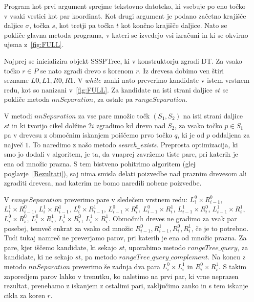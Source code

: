 \documentclass[a4paper, 12pt]{book}
\newcommand{\U}{\texttt{\_}}
\begin{document}
Program kot prvi argument sprejme tekstovno datoteko, ki vsebuje po eno točko v vsaki vrstici kot par koordinat. Kot drugi argument je podano začetno krajišče daljice $\sigma$, točka $s$, kot tretji pa točka $t$ kot končno krajišče daljice. Nato se pokliče glavna metoda programa, v kateri se izvedejo vsi izračuni in ki se okvirno ujema z~\ref{fig:FULL}.

Najprej se inicializira objekt SSSPTree, ki v konstruktorju zgradi DT. Za vsako točko $r\in P$ se nato zgradi drevo s korenom $r$. Iz drevesa dobimo ven štiri sezname $L0, L1, R0, R1$. V $while$ zanki nato preverimo kandidate v istem vrstnem redu, kot so nanizani v~\ref{fig:FULL}. Za kandidate na isti strani daljice $st$ se pokliče metoda $nnSeparation$, za ostale pa $rangeSeparation$.

V metodi $nnSeparation$ za vse pare množic točk $(S_1, S_2)$ na isti strani daljice $st$ in ki tvorijo cikel dolžine $2i$ zgradimo kd drevo nad $S_2$, za vsako točko $p\in S_1$ pa v drevesu z območnim iskanjem poiščemo prvo točko $q$, ki je od $p$ oddaljena za največ $1$. To naredimo z našo metodo \textit{search\U exists}. Preprosta optimizacija, ki smo jo dodali v algoritem, je ta, da vnaprej zavržemo tiste pare, pri katerih je ena od množic prazna. S tem bistveno pohitrimo algoritem (glej poglavje~\ref{Rezultati}), saj nima smisla delati poizvedbe nad praznim drevesom ali zgraditi drevesa, nad katerim ne bomo naredili nobene poizvedbe.

V $rangeSeparation$ preverimo pare v sledečem vrstnem redu: $L_i^0\times R_{i-1}^0$, $L_i^1\times R_{i-1}^0$, $L_i^1\times R_{i-1}^1$, $L_i^0\times R_{i-1}^1$, $L_{i-1}^0\times R_{i}^0$, $L_{i-1}^0\times R_{i}^1$, $L_{i-1}^1\times R_{i}^0$, $L_{i-1}^1\times R_{i}^1$, $L_{i}^0\times R_{i}^0$, $L_{i}^0\times R_{i}^1$, $L_{i}^1\times R_{i}^0$, $L_{i}^1\times R_{i}^1$. Območnih dreves ne gradimo za vsak par posebej, temveč enkrat za vsako od množic $R_{i-1}^0, R_{i-1}^1, R_{i}^0, R_{i}^1$, če je to potrebno. Tudi tukaj namreč ne preverjamo parov, pri katerih je ena od množic prazna. Za pare, kjer iščemo kandidate, ki sekajo $st$, uporabimo metodo $rangeTree\U query$, za kandidate, ki ne sekajo $st$, pa metodo $rangeTree\U query\U complement$. Na koncu z metodo $nnSeparation$ preverimo še zadnja dva para $L_i^0\times L_i^1$ in $R_i^0\times R_i^1$. S takim zaporedjem parov lahko v trenutku, ko naletimo na prvi par, ki vrne neprazen rezultat, prenehamo z iskanjem z ostalimi pari, zaključimo zanko in s tem iskanje cikla za koren $r$.
\end{document}
